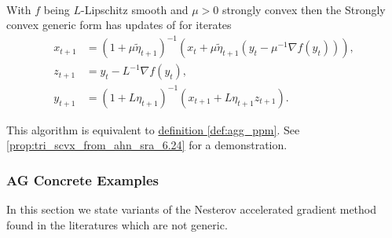         \begin{definition}
            \quad \\
            With $f$ being $L$-Lipschitz smooth and $\mu > 0$ strongly convex then the Strongly convex generic form has updates of for iterates
            \begin{align*}
                x_{t + 1} &= (1 + \mu\tilde \eta_{t + 1})^{-1}(x_t + \mu\tilde\eta_{t + 1}(y_t - \mu^{-1}\nabla f(y_t))), 
                \\
                z_{t + 1} &= y_t - L^{-1}\nabla f(y_t), 
                \\
                y_{t + 1} &= (1 + L\eta_{t + 1})^{-1}(x_{t + 1} + L\eta_{t + 1}z_{t +1}). 
            \end{align*}
        \end{definition}
        \begin{remark}
            This algorithm is equivalent to 
            \hyperref[def:agg_ppm]{definition \ref*{def:agg_ppm}}. 
            See \ref*{prop:tri_scvx_from_ahn_sra_6.24} for a demonstration. 
        \end{remark}

    \subsubsection{AG Concrete Examples}
        In this section we state variants of the Nesterov accelerated gradient method found in the literatures which are not generic. 
        
